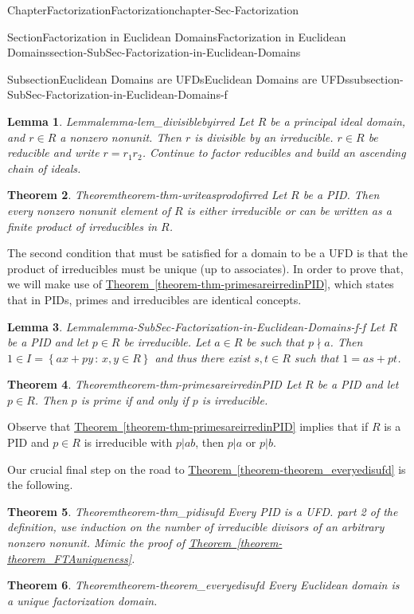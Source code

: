 \documentclass[oneside,10pt,]{book}
\newcommand{\xreffont}{\relax}
\numberwithin{equation}{section}
\newcommand{\setof}[2]{{\left\{#1\,\colon\,#2\right\}}}
\newtheorem{theorem}{Theorem}[section]
\newtheorem{lemma}[theorem]{Lemma}
\begin{document}
\begin{chapterptx}{Chapter}{Factorization}{}{Factorization}{}{}{chapter-Sec-Factorization}
\begin{sectionptx}{Section}{Factorization in Euclidean Domains}{}{Factorization in Euclidean Domains}{}{}{section-SubSec-Factorization-in-Euclidean-Domains}
\begin{subsectionptx}{Subsection}{Euclidean Domains are UFDs}{}{Euclidean Domains are UFDs}{}{}{subsection-SubSec-Factorization-in-Euclidean-Domains-f}
\begin{lemma}{Lemma}{}{}{lemma-lem_divisiblebyirred}
Let \(R\) be a principal ideal domain, and \(r\in R\) a nonzero nonunit. Then \(r\) is divisible by an irreducible.%
\noindentLet \(r\in R\) be reducible and write \(r = r_1 r_2\). Continue to factor reducibles and build an ascending chain of ideals.%
\end{lemma}
\begin{theorem}{Theorem}{}{}{theorem-thm-writeasprodofirred}%
Let \(R\) be a PID. Then every nonzero nonunit element of \(R\) is either irreducible or can be written as a finite product of irreducibles in \(R\).%
\end{theorem}
The second condition that must be satisfied for a domain to be a UFD is that the product of irreducibles must be unique (up to associates). In order to prove that, we will make use of \hyperref[theorem-thm-primesareirredinPID]{Theorem~{\xreffont\ref{theorem-thm-primesareirredinPID}}}, which states that in PIDs, primes and irreducibles are identical concepts.%
\begin{lemma}{Lemma}{}{}{lemma-SubSec-Factorization-in-Euclidean-Domains-f-f}%
Let \(R\) be a PID and let \(p\in R\) be irreducible. Let \(a\in R\) be such that \(p\nmid a\). Then \(1\in I = \setof{ax+py}{x,y\in R}\) and thus there exist \(s,t\in R\) such that \(1 = as+pt\).%
\end{lemma}
\begin{theorem}{Theorem}{}{}{theorem-thm-primesareirredinPID}%
Let \(R\) be a PID and let \(p\in R\). Then \(p\) is prime if and only if \(p\) is irreducible.%
\end{theorem}
Observe that \hyperref[theorem-thm-primesareirredinPID]{Theorem~{\xreffont\ref{theorem-thm-primesareirredinPID}}} implies that if \(R\) is a PID and \(p\in R\) is irreducible with \(p|ab\), then \(p|a\) or \(p|b\).%
\par
Our crucial final step on the road to \hyperref[theorem-theorem_everyedisufd]{Theorem~{\xreffont\ref{theorem-theorem_everyedisufd}}} is the following.%
\begin{theorem}{Theorem}{}{}{theorem-thm_pidisufd}%
Every PID is a UFD.%
\noindentFor part 2 of the definition, use induction on the number of irreducible divisors of an arbitrary nonzero nonunit. Mimic the proof of \hyperref[theorem-theorem_FTAuniqueness]{Theorem~{\xreffont\ref{theorem-theorem_FTAuniqueness}}}.\end{theorem}
\begin{theorem}{Theorem}{}{}{theorem-theorem_everyedisufd}%
Every Euclidean domain is a unique factorization domain.%
\end{theorem}

\end{subsectionptx}
\end{sectionptx}
\end{chapterptx}
\end{document}
